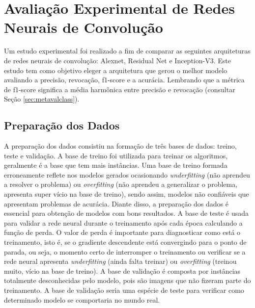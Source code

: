 \section{Avaliação Experimental de Redes Neurais de Convolução}\label{sec:avalexp}

Um estudo experimental foi realizado a fim de comparar as seguintes arquiteturas de redes neurais de convolução: Alexnet, Residual Net e Inception-V3. Este estudo tem como objetivo eleger a arquitetura que gerou o melhor modelo avaliando a precisão, revocação, f1-score e a acurácia. Lembrando que a métrica de f1-score significa a média harmônica entre precisão e revocação (consultar Seção \ref{sec:metavalclass}).  



\subsection{Preparação dos Dados}\label{prepdados}
A preparação dos dados consistiu na formação de três bases de dados: treino, teste e validação. A base de treino foi utilizada para treinar os algoritmos, geralmente é a base que tem mais instâncias. Uma base de treino formada erroneamente reflete nos modelos gerados ocasionando \textit{underfitting} (não aprendeu a resolver o problema) ou \textit{overfitting} (não aprendeu a generalizar o problema, apresenta super vício na base de treino), sendo assim, modelos não confiáveis que apresentam problemas de acurácia. Diante disso, a preparação dos dados é essencial para obtenção de modelos com bons resultados. A base de teste é usada para validar a rede neural durante o treinamento após cada época calculando a função de perda. O valor de perda é importante para diagnosticar como está o treinamento, isto é, se o gradiente descendente está convergindo para o ponto de parada, ou seja, o momento certo de interromper o treinamento ou verificar se a rede neural apresenta \textit{underfitting} (ainda falta treinar) ou \textit{overfitting} (treinou muito, vício na base de treino). A base de validação é composta por instâncias totalmente desconhecidas pelo modelo, pois são imagens que não fizeram parte do treinamento. A base de validação seria uma espécie de teste para verificar como determinado modelo se comportaria no mundo real.  

